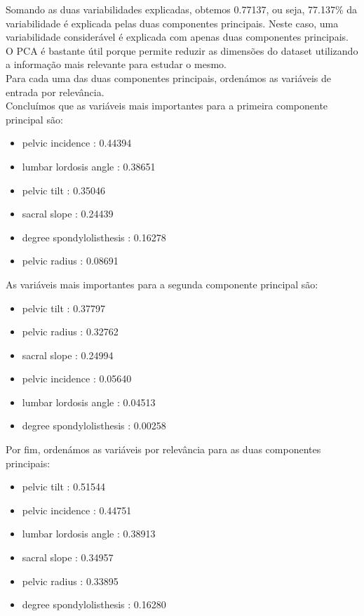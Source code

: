 \documentclass[a4paper,12pt]{article} %
\begin{document}
\begin{enumerate}
Somando as duas variabilidades explicadas, obtemos 0.77137, ou seja, 77.137\% da variabilidade é explicada pelas duas componentes principais. Neste caso, uma variabilidade considerável é explicada com apenas duas componentes principais.
O PCA é bastante útil porque permite reduzir as dimensões do dataset utilizando a informação mais relevante para estudar o mesmo.   \\

Para cada uma das duas componentes principais, ordenámos as variáveis de entrada por relevância. \\

Concluímos que as variáveis mais importantes para a primeira componente principal são: 
\begin{itemize}
    \item pelvic incidence :  0.44394
    \item lumbar lordosis angle :  0.38651
    \item pelvic tilt :  0.35046
    \item sacral slope :  0.24439
    \item degree spondylolisthesis :  0.16278
    \item pelvic radius :  0.08691
\end{itemize}

As variáveis mais importantes para a segunda componente principal são: 
\begin{itemize}
    \item pelvic tilt :  0.37797
    \item pelvic radius :  0.32762
    \item sacral slope :  0.24994
    \item pelvic incidence :  0.05640
    \item lumbar lordosis angle :  0.04513
    \item degree spondylolisthesis :  0.00258
\end{itemize}

Por fim, ordenámos as variáveis por relevância para as duas componentes principais: 
\begin{itemize}    
    \item pelvic tilt :  0.51544
    \item pelvic incidence :  0.44751
    \item lumbar lordosis angle :  0.38913
    \item sacral slope :  0.34957
    \item pelvic radius :  0.33895
    \item degree spondylolisthesis :  0.16280 \\
\end{itemize} 


\end{enumerate}
\end{document}
